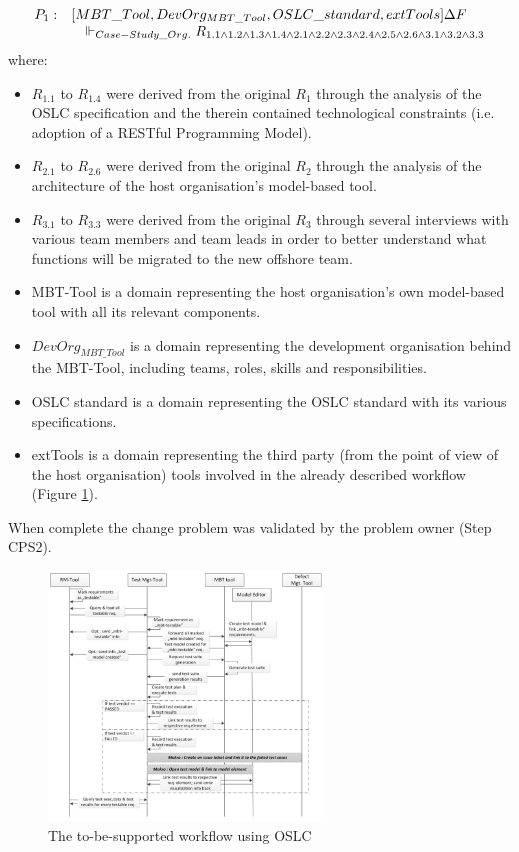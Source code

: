 \documentclass[runningheads,a4paper]{llncs}
\begin{document}
\[
	\begin{array}{ll}
		P_1: & [MBT\_Tool, DevOrg_{MBT\_Tool}, OSLC\_standard, extTools ] \Delta F \\
		&\quad \Vdash_{Case-Study\_Org.} R_{1.1 \wedge 1.2 \wedge 1.3 \wedge 1.4 \wedge 2.1 \wedge 2.2 \wedge 2.3 \wedge 2.4 \wedge 2.5 \wedge 2.6 \wedge 3.1 \wedge 3.2 \wedge 3.3}
	\end{array}
\]
where:
\begin{itemize}
	\item $R_{1.1}$ to $R_{1.4}$ were derived from the original $R_1$ through the analysis of the OSLC specification and the therein contained technological constraints (i.e. adoption of a RESTful Programming Model).
	\item $R_{2.1}$ to $R_{2.6}$ were derived from the original $R_2$ through the analysis of the architecture of the host organisation's model-based tool.
	\item $R_{3.1}$ to $R_{3.3}$ were derived from the original $R_3$ through several interviews with various team members and team leads in order to better understand what functions will be migrated to the new offshore team.
	\item MBT-Tool is a domain representing the host organisation's own model-based tool with all its relevant components.
	\item $DevOrg_{MBT\_Tool}$ is a domain representing the development organisation behind the MBT-Tool, including teams, roles, skills and responsibilities.
	\item OSLC standard is a domain representing the OSLC standard with its various specifications.
	\item extTools is a domain representing the third party (from the point of view of the host organisation) tools involved in the already described workflow (Figure \ref{fig:oslcFW}).
\end{itemize}

When complete the change problem was validated by the problem owner (Step CPS2).

\begin{figure}[htbp]
	\centering
	\includegraphics[width=0.65\textwidth]{pics/workflow.png}
	\caption{The to-be-supported workflow using OSLC}
	\label{fig:oslcFW}
\end{figure}
\end{document}
